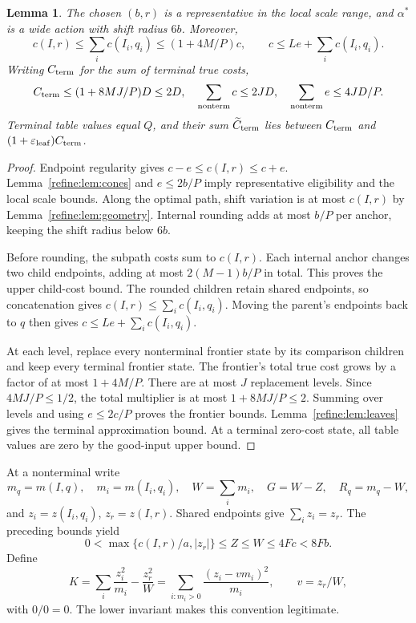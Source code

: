 \documentclass[11pt]{article}
\newtheorem{lemma}[theorem]{Lemma}
\theoremstyle{definition}
\newcommand{\1}{\mathbf 1}
\begin{document}
\begin{lemma}\label{refine:lem:comparison-costs}
The chosen $(b,r)$ is a representative in the local scale range, and $\alpha^*$ is a wide action with shift radius $6b$. Moreover,
\[
 c(I,r)\le\sum_i c(I_i,q_i)\le(1+4M/P)c,
 \qquad c\le Le+\sum_i c(I_i,q_i).
\]
Writing $C_{\rm term}$ for the sum of terminal true costs,
\[
 C_{\rm term}\le(1+8MJ/P)D\le2D,\quad
 \sum_{\rm nonterm}c\le2JD,\quad
 \sum_{\rm nonterm}e\le4JD/P.
\]
Terminal table values equal $Q$, and their sum $\widetilde C_{\rm term}$ lies between $C_{\rm term}$ and $(1+\varepsilon_{\rm leaf})C_{\rm term}$.
\end{lemma}
\begin{proof}
Endpoint regularity gives $c-e\le c(I,r)\le c+e$.
Lemma~\ref{refine:lem:cones} and $e\le2b/P$ imply representative
eligibility and the local scale bounds.
Along the optimal path, shift variation is at most $c(I,r)$ by
Lemma~\ref{refine:lem:geometry}.
Internal rounding adds at most $b/P$ per anchor, keeping the shift
radius below $6b$.

Before rounding, the subpath costs sum to $c(I,r)$.
Each internal anchor changes two child endpoints, adding at most
$2(M-1)b/P$ in total. This proves the upper child-cost bound.
The rounded children retain shared endpoints, so concatenation gives
$c(I,r)\le\sum_i c(I_i,q_i)$. Moving the parent's endpoints back to $q$
then gives $c\le Le+\sum_i c(I_i,q_i)$.

At each level, replace every nonterminal frontier state by its comparison
children and keep every terminal frontier state.
The frontier's total true cost grows by a factor of at most $1+4M/P$.
There are at most $J$ replacement levels.
Since $4MJ/P\le1/2$, the total multiplier is at most $1+8MJ/P\le2$.
Summing over levels and using $e\le2c/P$ proves the frontier bounds.
Lemma~\ref{refine:lem:leaves} gives the terminal approximation bound.
At a terminal zero-cost state, all table values are zero by the
good-input upper bound.
\end{proof}

At a nonterminal write
\[
 m_q=m(I,q),\quad m_i=m(I_i,q_i),\quad
 W=\sum_i m_i,\quad G=W-Z,\quad R_q=m_q-W,
\]
and $z_i=z(I_i,q_i)$, $z_r=z(I,r)$. Shared endpoints give $\sum_i z_i=z_r$. The preceding bounds yield
\[
 0<\max\{c(I,r)/a,|z_r|\}\le Z\le W\le4Fc<8Fb.
\]
Define
\[
 K=\sum_i\frac{z_i^2}{m_i}-\frac{z_r^2}{W}
   =\sum_{i:m_i>0}\frac{(z_i-vm_i)^2}{m_i},\qquad v=z_r/W,
\]
with $0/0=0$. The lower invariant makes this convention legitimate.
\end{document}
